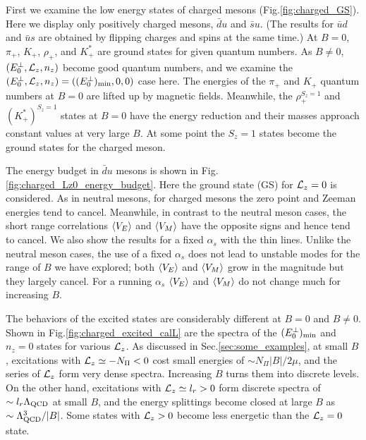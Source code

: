 First we examine the low energy states of charged mesons (Fig.\ref{fig:charged_GS}). Here we display only positively charged mesons, $\bar{d}u$ and $\bar{s}u$. 
(The results for $\bar{u}d$ and $\bar{u}s$ are obtained by flipping charges and spins at the same time.) 
At $B=0$, $\pi_+$, $K_+$, $\rho_+$, and $K_+^*$ are ground states for given quantum numbers. 
As $B\neq 0$, $(E_0^{\perp}, \mathcal{L}_z, n_z)$ become good quantum numbers, and we examine the $(E_0^{\perp}, \mathcal{L}_z, n_z)=( (E_0^{\perp})_{\rm min},0,0)$ case here. 
The energies of the $\pi_+$ and $K_+$ quantum numbers at $B=0$ are lifted up by magnetic fields. 
Meanwhile, the $\rho_+^{S_z=1}$ and $(K^*_+)^{S_z=1}$ states at $B=0$ have the energy reduction and their masses approach constant values at very large $B$. 
At some point the $S_z=1$ states become the ground states for the charged meson.

The energy budget in $\bar{d}u$ mesons is shown in Fig.\ref{fig:charged_Lz0_energy_budget}. 
Here  the ground state (GS) for $\mathcal{L}_z=0$ is considered.
As in neutral mesons, for charged mesons the zero point and Zeeman energies tend to cancel.
Meanwhile, in contrast to the neutral meson cases, the short range correlations $\langle V_E \rangle$ and $\langle V_M \rangle$ have the opposite signs and hence tend to cancel.
We also show the results for a fixed $\alpha_s$ with the thin lines.
Unlike the neutral meson cases, the use of a fixed $\alpha_s$ does not lead to unstable modes for the range of $B$ we have explored;
both $\langle V_E \rangle$ and $\langle V_M\rangle$ grow in the magnitude but they largely cancel.
For a running $\alpha_s$ $\langle V_E \rangle$ and $\langle V_M\rangle$ do not change much for increasing $B$.


The behaviors of the excited states are considerably different at $B=0$ and $B \neq 0$. 
Shown in Fig.\ref{fig:charged_excited_calL} are the spectra of the $(E_0^{\perp})_{\rm min}$ and $n_z=0$ states for various $\mathcal{L}_z$. 
As discussed in Sec.\ref{sec:some_examples},
at small $B$, excitations with 
$\mathcal{L}_z \simeq - N_\Pi < 0$
cost small energies of $\sim N_\Pi |B|/2\mu$, and the series of $\mathcal{L}_z$ form very dense spectra. 
Increasing $B$ turns them into discrete levels. 
On the other hand, excitations with 
$\mathcal{L}_z \simeq l_r > 0$ form discrete spectra of $\sim l_r \Lambda_{\rm QCD}$ at small $B$, 
and the energy splittings become closed at large $B$ as $\sim \Lambda_{\rm QCD}^3/|B|$. 
Some states with $\mathcal{L}_z > 0$ become less energetic than the $\mathcal{L}_z=0$ state.




